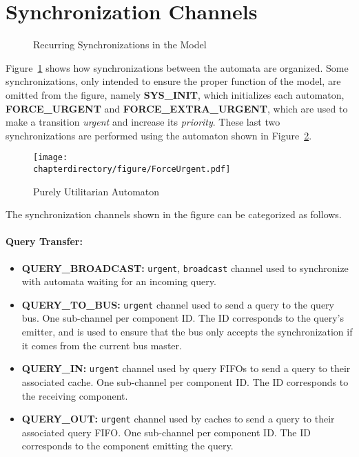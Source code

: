 \section{Synchronization Channels}
\label{sec:modeling:channels}
\begin{figure}[hbt!]
\begin{center}

\end{center}
\caption{Recurring Synchronizations in the Model}
\label{fig:UPPAAL:Comms}
\end{figure}
Figure~\ref{fig:UPPAAL:Comms} shows how synchronizations between the
automata are organized. Some synchronizations, only intended to ensure the
proper function of the model, are omitted from the figure, namely
\textbf{SYS\_INIT}, which initializes each automaton, \textbf{FORCE\_URGENT}
and \textbf{FORCE\_EXTRA\_URGENT}, which are used to make a transition
\textit{urgent} and increase its \textit{priority}. These last two
synchronizations are performed using the automaton shown in
Figure~\ref{fig:UPPAAL:ForceUrgent}.

\begin{figure}[hbt!]
\begin{center}
\texttt{[image: \\chapterdirectory/figure/ForceUrgent.pdf]}
\end{center}
\caption{Purely Utilitarian Automaton}
\label{fig:UPPAAL:ForceUrgent}
\end{figure}

The synchronization channels shown in the figure can be categorized as follows.

\paragraph{Query Transfer:}
\begin{itemize}
\item \textbf{QUERY\_BROADCAST:}
   \texttt{urgent}, \texttt{broadcast} channel used to synchronize with
   automata waiting for an incoming query.

\item \textbf{QUERY\_TO\_BUS:}
   \texttt{urgent} channel used to send a query to the query bus.
   One sub-channel per component ID. The ID corresponds to the query's emitter,
   and is used to ensure that the bus only accepts the synchronization if it
   comes from the current bus master.

\item \textbf{QUERY\_IN:}
   \texttt{urgent} channel used by query FIFOs to send a query to their
   associated cache. One sub-channel per component ID. The ID corresponds to the
   receiving component.

\item \textbf{QUERY\_OUT:}
   \texttt{urgent} channel used by caches to send a query to their associated
   query FIFO. One sub-channel per component ID. The ID corresponds to the
   component emitting the query.
\end{itemize}

